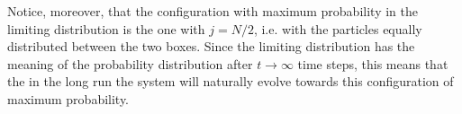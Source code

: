 Notice, moreover, that the configuration with maximum probability in the limiting distribution is the one with $j = N/2$, i.e. with the particles equally distributed between the two boxes. Since the limiting distribution has the meaning of the probability distribution after $t\rightarrow \infty$ time steps, this means that the in the long run the system will naturally evolve towards this configuration of maximum probability.